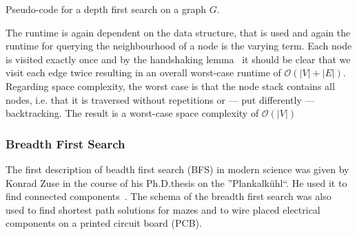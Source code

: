         \begin{algorithm}[htp]
            \hrulealg
        \caption{Pseudo-code for a depth first search on a graph $G$.}\label{dfs}
        \end{algorithm}
        
        The runtime is again dependent on the data structure, that is used and again the runtime for querying the neighbourhood of a node is the varying term. 
        Each node is visited exactly once and by the handshaking lemma~\autocite{Gross1998GraphTA} it should be clear that we visit each edge twice resulting in an overall worst-case runtime of $\mathcal{O}(|V|+|E|)$. 
        Regarding space complexity, the worst case is that the node stack contains all nodes, i.e. that it is traversed without repetitions or --- put differently --- backtracking. 
        The result is a worst-case space complexity of $\mathcal{O}(|V|)$
        
        \subsubsection*{Breadth First Search} 
        The first description of beadth first search (BFS) in modern science was given by Konrad Zuse in the course of his Ph.D.thesis on the ''Plankalkühl``. 
        He used it to find connected components~\autocite{zuse1948allgemeinen}. 
        The schema of the breadth first search was also used to find shortest path solutions for mazes and to wire placed electrical components on a printed circuit board (PCB). \\
        
